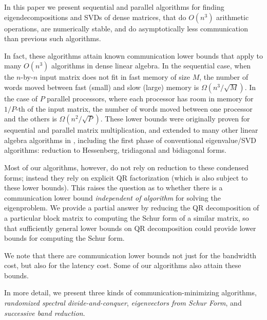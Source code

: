 \documentclass{article}
\theoremstyle{definition}
\begin{document}
In this paper we present sequential and parallel algorithms 
for finding eigendecompositions  and SVDs of dense matrices, 
that do $O(n^3)$ arithmetic operations, are numerically stable, 
and do asymptotically less communication than previous such algorithms. 

In fact, these algorithms attain known communication lower bounds 
that apply to many $O(n^3)$ algorithms in dense linear algebra.  
In the sequential case, when the $n$-by-$n$ input matrix does not 
fit in fast memory of size $M$, the number of words moved between 
fast (small) and slow (large) memory is $\Omega (n^3/\sqrt{M})$.
In the case of $P$ parallel processors, where each processor has 
room in memory for $1/P$-th of the input matrix, the number of 
words moved between one processor and the others is 
$\Omega (n^2 / \sqrt{P} )$. These lower bounds were originally 
proven for sequential \cite{HongKung81} and parallel \cite{ITT04} 
matrix multiplication, and extended to many other linear algebra 
algorithms in \cite{BDHS10}, including the first phase of 
conventional eigenvalue/SVD algorithms: reduction to Hessenberg, 
tridiagonal and bidiagonal forms.

Most of our algorithms, however, do not rely on reduction to these 
condensed forms; instead they rely on explicit QR factorization 
(which is also subject to these lower bounds). This raises the 
question as to whether there is a communication lower bound 
{\em independent of algorithm} for solving the eigenproblem. 
We provide a partial answer by reducing the QR decomposition
of a particular block matrix to computing the Schur form
of a similar matrix, so that sufficiently general lower bounds 
on QR decomposition could provide lower bounds for computing
the Schur form.

We note that there are communication lower bounds not just for the bandwidth cost, but also for the latency cost. 
Some of our algorithms also attain these bounds.

In more detail, we present three kinds of communication-minimizing
algorithms, {\em randomized spectral divide-and-conquer}, {\em eigenvectors from Schur Form}, 
and {\em successive band reduction}. 
\end{document}
